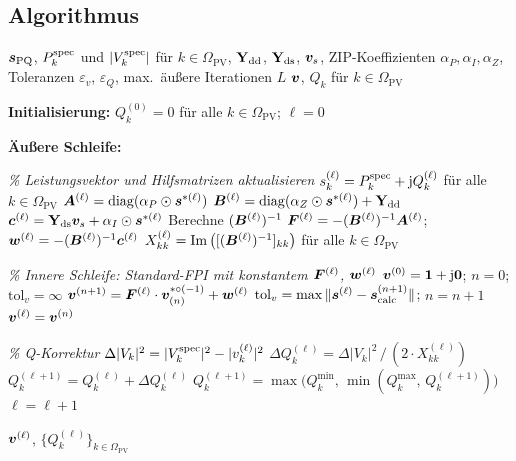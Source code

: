 \subsection{Algorithmus}
\label{subsec:methode_a_algorithmus}

\begin{algorithm}[H]
	\caption{Methode A: Äußere Q-Schleife mit innerem TPF (allgemeiner ZIP-Fall)}
	\label{alg:methode_a}
	\begin{algorithmic}[1]
		\REQUIRE $\boldsymbol{s}_{\text{PQ}}$, $P_k^{\mathrm{spec}}$ und $|V_k^{\mathrm{spec}}|$ für $k \in \Omega_{\text{PV}}$, $\mathbf{Y}_{\mathrm{dd}}$, $\mathbf{Y}_{\mathrm{ds}}$, $\boldsymbol{v}_s$, ZIP-Koeffizienten $\alpha_P, \alpha_I, \alpha_Z$, Toleranzen $\varepsilon_v$, $\varepsilon_Q$, max.\ äußere Iterationen $L$
		\ENSURE $\boldsymbol{v}$, $Q_k$ für $k \in \Omega_{\text{PV}}$
		
		\STATE \textbf{Initialisierung:}
		\STATE $Q_k^{(0)} = 0$ für alle $k \in \Omega_{\text{PV}}$; \quad $\ell = 0$
		
		\STATE
		\STATE \textbf{Äußere Schleife:}
		
		\STATE \textit{\% Leistungsvektor und Hilfsmatrizen aktualisieren}
		\STATE $s_k^{(\ell)} = P_k^{\mathrm{spec}} + \mathrm{j} Q_k^{(\ell)}$ für alle $k \in \Omega_{\text{PV}}$
		\STATE $\boldsymbol{A}^{(\ell)} = \operatorname{diag}(\alpha_P \odot \boldsymbol{s}^{*(\ell)})$
		\STATE $\boldsymbol{B}^{(\ell)} = \operatorname{diag}(\alpha_Z \odot \boldsymbol{s}^{*(\ell)}) + \mathbf{Y}_{\mathrm{dd}}$
		\STATE $\boldsymbol{c}^{(\ell)} = \mathbf{Y}_{\mathrm{ds}}\boldsymbol{v}_s + \alpha_I \odot \boldsymbol{s}^{*(\ell)}$
		\STATE Berechne $(\boldsymbol{B}^{(\ell)})^{-1}$ 
		\STATE $\boldsymbol{F}^{(\ell)} = -(\boldsymbol{B}^{(\ell)})^{-1}\boldsymbol{A}^{(\ell)}$; \quad $\boldsymbol{w}^{(\ell)} = -(\boldsymbol{B}^{(\ell)})^{-1}\boldsymbol{c}^{(\ell)}$
		\STATE $X_{kk}^{(\ell)} = \operatorname{Im}\left([(\boldsymbol{B}^{(\ell)})^{-1}]_{kk}\right)$ für alle $k \in \Omega_{\text{PV}}$
		
		\STATE
		\STATE \textit{\% Innere Schleife: Standard-FPI mit konstantem $\boldsymbol{F}^{(\ell)}$, $\boldsymbol{w}^{(\ell)}$}
		\STATE $\boldsymbol{v}^{(0)} = \mathbf{1} + \mathrm{j}\mathbf{0}$; \quad $n = 0$; \quad $\text{tol}_v = \infty$
		\STATE $\boldsymbol{v}^{(n+1)} = \boldsymbol{F}^{(\ell)} \cdot \boldsymbol{v}_{(n)}^{*{\circ(-1)}} + \boldsymbol{w}^{(\ell)}$
		\STATE $\text{tol}_v = \max\|\boldsymbol{s}^{(\ell)} - \boldsymbol{s}^{(n+1)}_{\text{calc}}\|$; \quad $n = n + 1$
		\ENDWHILE
		\STATE $\boldsymbol{v}^{(\ell)} = \boldsymbol{v}^{(n)}$ 
		
		\STATE
		\STATE \textit{\% Q-Korrektur}
		\STATE $\Delta|V_k|^2 = |V_k^{\mathrm{spec}}|^2 - |v_k^{(\ell)}|^2$
		\STATE $\Delta Q_k^{(\ell)} = \Delta|V_k|^2 \,/\, (2 \cdot X_{kk}^{(\ell)})$
		\STATE $Q_k^{(\ell+1)} = Q_k^{(\ell)} + \Delta Q_k^{(\ell)}$
		\STATE $Q_k^{(\ell+1)} = \max\big(Q_k^{\min},\, \min(Q_k^{\max},\, Q_k^{(\ell+1)})\big)$ 
		\ENDFOR
		\STATE $\ell = \ell + 1$
		
		\ENDWHILE
		\RETURN $\boldsymbol{v}^{(\ell)}$, $\{Q_k^{(\ell)}\}_{k \in \Omega_{\text{PV}}}$
	\end{algorithmic}
\end{algorithm}

